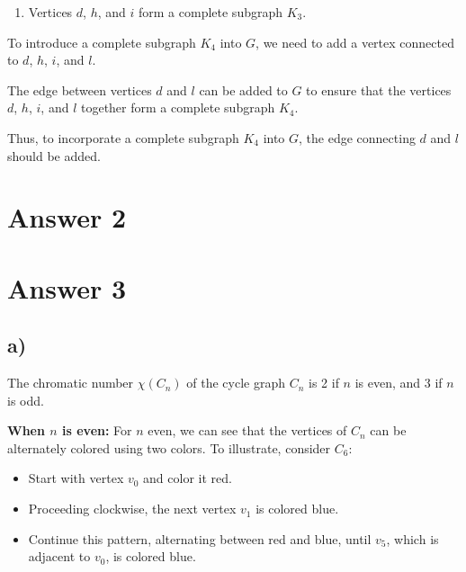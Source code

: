 \documentclass[12pt]{article}
\begin{document}
\begin{enumerate}
    \item Vertices \( d \), \( h \), and \( i \) form a complete subgraph \( K_3 \).
\end{enumerate}

To introduce a complete subgraph \( K_4 \) into \( G \), we need to add a vertex connected to \( d \), \( h \), \( i \), and \( l \).

The edge between vertices \( d \) and \( l \) can be added to \( G \) to ensure that the vertices \( d \), \( h \), \( i \), and \( l \) together form a complete subgraph \( K_4 \).

Thus, to incorporate a complete subgraph \( K_4 \) into \( G \), the edge connecting \( d \) and \( l \) should be added.


\section*{Answer 2}



\section*{Answer 3}

\subsection*{a)}

The chromatic number \( \chi(C_n) \) of the cycle graph \( C_n \) is 2 if \( n \) is even, and 3 if \( n \) is odd.



\textbf{ When \( n \) is even:}
For \( n \) even, we can see that the vertices of \( C_n \) can be alternately colored using two colors. To illustrate, consider \( C_6 \):

\begin{itemize}
    \item Start with vertex \( v_0 \) and color it red.
    \item Proceeding clockwise, the next vertex \( v_1 \) is colored blue.
    \item Continue this pattern, alternating between red and blue, until \( v_5 \), which is adjacent to \( v_0 \), is colored blue.
\end{itemize}
\end{document}
